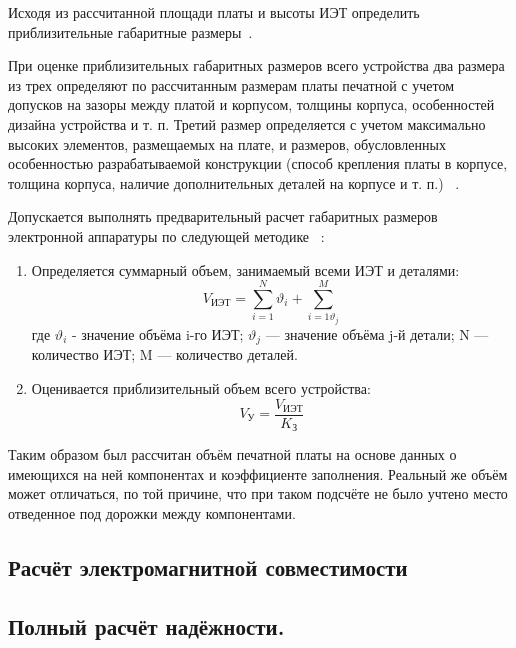 Исходя из рассчитанной площади платы и высоты ИЭТ определить
приблизительные габаритные размеры~\cite{Kostukevich2012}.

При оценке приблизительных габаритных размеров всего устройства два
размера из трех определяют по рассчитанным размерам платы печатной с
учетом допусков на зазоры между платой и корпусом, толщины корпуса,
особенностей дизайна устройства и т. п.  Третий размер определяется с
учетом максимально высоких элементов, размещаемых на плате, и
размеров, обусловленных особенностью разрабатываемой конструкции
(способ крепления платы в корпусе, толщина корпуса, наличие
дополнительных деталей на корпусе и т. п.) ~\cite{Kostukevich2012}.

Допускается выполнять предварительный расчет габаритных размеров
электронной аппаратуры по следующей методике ~\cite{Kostukevich2012}:
\begin{enumerate}
\item Определяется суммарный объем, занимаемый всеми ИЭТ и деталями:
  \begin{equation}
    V_{ИЭТ} = \sum^N_{i=1}\vartheta_i +   \sum^M_{i=1\vartheta_j}
  \end{equation}
%
где $\vartheta_i$ - значение объёма i-го ИЭТ;
$\vartheta_j$ — значение объёма j-й детали;
N — количество ИЭТ;
M — количество деталей.

\item Оценивается приблизительный объем всего устройства:
  \begin{equation}
    V_{\text{У}} = \frac{V_{\text{ИЭТ}}}{K_{\text{З}}}
  \end{equation}
\end{enumerate}

  Таким образом был рассчитан объём печатной платы на основе данных о
имеющихся на ней компонентах и коэффициенте заполнения.  Реальный же
объём может отличаться, по той причине, что при таком подсчёте не было
учтено место отведенное под дорожки между компонентами.


\subsection{Расчёт электромагнитной совместимости}


\subsection{Полный расчёт надёжности. }

